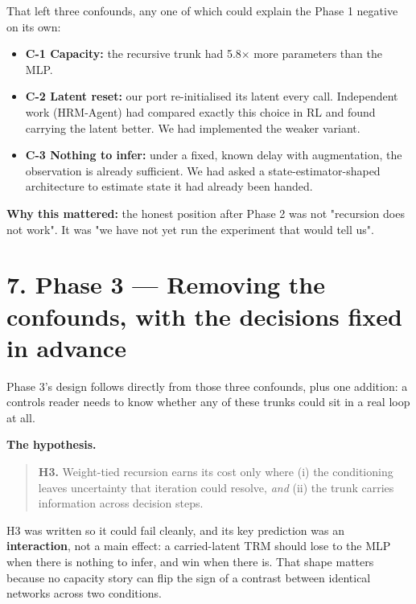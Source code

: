 \documentclass[11pt]{article}
\begin{document}
That left three confounds, any one of which could explain the Phase 1 negative on its own:

\begin{itemize}
\item \textbf{C-1 Capacity:} the recursive trunk had 5.8$\times$ more parameters than the MLP.
\item \textbf{C-2 Latent reset:} our port re-initialised its latent every call. Independent work (HRM-Agent) had compared exactly this choice in RL and found carrying the latent better. We had implemented the weaker variant.
\item \textbf{C-3 Nothing to infer:} under a fixed, known delay with augmentation, the observation is already sufficient. We had asked a state-estimator-shaped architecture to estimate state it had already been handed.
\end{itemize}



\textbf{Why this mattered:} the honest position after Phase 2 was not "recursion does not work". It was "we have not yet run the experiment that would tell us".



\section*{7. Phase 3 --- Removing the confounds, with the decisions fixed in advance}



Phase 3's design follows directly from those three confounds, plus one addition: a controls reader needs to know whether any of these trunks could sit in a real loop at all.



\textbf{The hypothesis.}



\begin{quote}\textbf{H3.} Weight-tied recursion earns its cost only where (i) the conditioning leaves uncertainty that iteration could resolve, \emph{and} (ii) the trunk carries information across decision steps.\end{quote}



H3 was written so it could fail cleanly, and its key prediction was an \textbf{interaction}, not a main effect: a carried-latent TRM should lose to the MLP when there is nothing to infer, and win when there is. That shape matters because no capacity story can flip the sign of a contrast between identical networks across two conditions.
\end{document}
